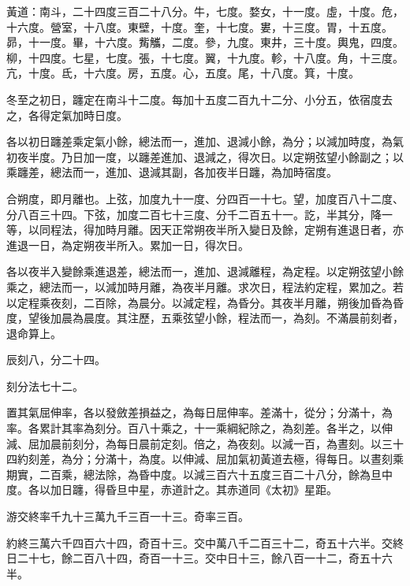 \begin{pinyinscope}
 黃道：南斗，二十四度三百二十八分。牛，七度。婺女，十一度。虛，十度。危，十六度。營室，十八度。東壁，十度。奎，十七度。婁，十三度。胃，十五度。昴，十一度。畢，十六度。觜觿，二度。參，九度。東井，三十度。輿鬼，四度。柳，十四度。七星，七度。張，十七度。翼，十九度。軫，十八度。角，十三度。亢，十度。氐，十六度。房，五度。心，五度。尾，十八度。箕，十度。



 冬至之初日，躔定在南斗十二度。每加十五度二百九十二分、小分五，依宿度去之，各得定氣加時日度。



 各以初日躔差乘定氣小餘，總法而一，進加、退減小餘，為分；以減加時度，為氣初夜半度。乃日加一度，以躔差進加、退減之，得次日。以定朔弦望小餘副之；以乘躔差，總法而一，進加、退減其副，各加夜半日躔，為加時宿度。



 合朔度，即月離也。上弦，加度九十一度、分四百一十七。望，加度百八十二度、分八百三十四。下弦，加度二百七十三度、分千二百五十一。訖，半其分，降一等，以同程法，得加時月離。因天正常朔夜半所入變日及餘，定朔有進退日者，亦進退一日，為定朔夜半所入。累加一日，得次日。



 各以夜半入變餘乘進退差，總法而一，進加、退減離程，為定程。以定朔弦望小餘乘之，總法而一，以減加時月離，為夜半月離。求次日，程法約定程，累加之。若以定程乘夜刻，二百除，為晨分。以減定程，為昏分。其夜半月離，朔後加昏為昏度，望後加晨為晨度。其注歷，五乘弦望小餘，程法而一，為刻。不滿晨前刻者，退命算上。



 辰刻八，分二十四。



 刻分法七十二。



 置其氣屈伸率，各以發斂差損益之，為每日屈伸率。差滿十，從分；分滿十，為率。各累計其率為刻分。百八十乘之，十一乘綱紀除之，為刻差。各半之，以伸減、屈加晨前刻分，為每日晨前定刻。倍之，為夜刻。以減一百，為晝刻。以三十四約刻差，為分；分滿十，為度。以伸減、屈加氣初黃道去極，得每日。以晝刻乘期實，二百乘，總法除，為昏中度。以減三百六十五度三百二十八分，餘為旦中度。各以加日躔，得昏旦中星，赤道計之。其赤道同《太初》星距。



 游交終率千九十三萬九千三百一十三。奇率三百。



 約終三萬六千四百六十四，奇百十三。交中萬八千二百三十二，奇五十六半。交終日二十七，餘二百八十四，奇百一十三。交中日十三，餘八百一十二，奇五十六半。




\end{pinyinscope}
